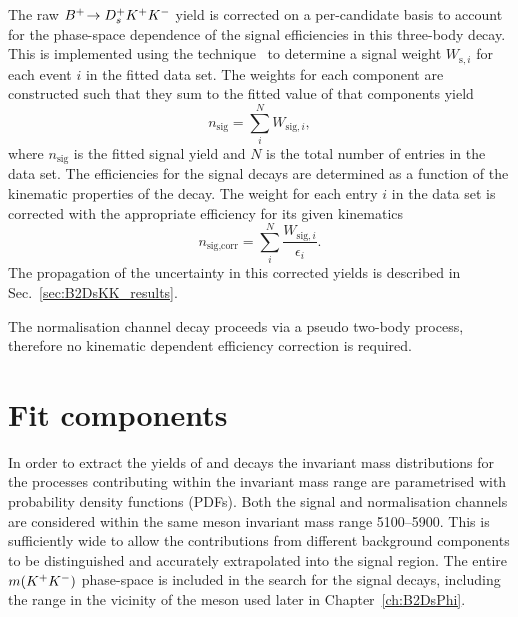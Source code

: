 The raw ${{{B}^+}}\!\rightarrow {\ensuremath{{D}^+_{s}}}{\ensuremath{{K}^+}}{\ensuremath{{K}^-}}$ yield is corrected on a per-candidate basis to account for the phase-space dependence of the signal efficiencies in this three-body decay. This is implemented using the \sPlot technique~\cite{Pivk:2004ty} to determine a signal weight $W_{\text{s},i}$ for each event $i$ in the fitted data set. The weights for each component are constructed such that they sum to the fitted value of that components yield
\begin{equation}
n_{\text{sig}} = \sum_{i}^{N} W_{\text{sig},i},
\end{equation}
where $n_{\text{sig}}$ is the fitted signal yield and $N$ is the total number of entries in the data set.
The efficiencies for the \decay{\Bp}{\Dsp\Kp\Km} signal decays are determined as a function of the kinematic properties of the decay. The weight for each entry $i$ in the data set is corrected with the appropriate efficiency for its given kinematics
\begin{equation}
n_{\text{sig},\text{corr}} = \sum_{i}^{N} \frac{W_{\text{sig},i}}{\epsilon_{i}}.
\label{eq:B2DsKK_corrected_yield}
\end{equation}
The propagation of the uncertainty in this corrected yields is described in Sec.~\ref{sec:B2DsKK_results}.

The normalisation channel decay proceeds via a pseudo two-body process, therefore no kinematic dependent efficiency correction is required.  



\section{Fit components}
\label{sec:B2DsKK_fitcomps}

In order to extract the yields of \decay{\Bp}{\Dsp\Dzb} and \decay{\Bp}{\Dsp\Kp\Km} decays the invariant mass distributions for the processes contributing within the invariant mass range are parametrised with probability density functions (PDFs).
Both the signal and normalisation channels are considered within the same \Bp meson invariant mass range 5100--5900\mevcc. This is sufficiently wide to allow the contributions from different background components to be distinguished and accurately extrapolated into the signal region. The entire $m({{K}^+}{{K}^-})$ phase-space is included in the search for the signal decays, including the range in the vicinity of the \phiz meson used later in Chapter~\ref{ch:B2DsPhi}. 



